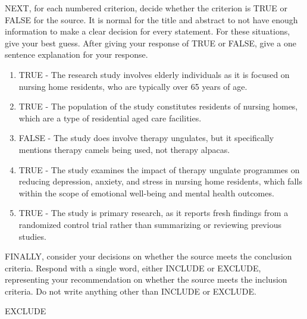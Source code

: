 \documentclass{article}
\begin{document}
\begin{description}
    \System NEXT, for each numbered criterion, decide whether the criterion is
    TRUE or FALSE for the source. It is normal for the title and abstract to
    not have enough information to make a clear decision for every statement.
    For these situations, give your best guess. After giving your response of
    TRUE or FALSE, give a one sentence explanation for your response.

    \GPT \begin{enumerate}
      \item{TRUE - The research study involves elderly individuals as it is
        focused on nursing home residents, who are typically over 65 years of
        age.}
      \item{TRUE - The population of the study constitutes residents of nursing
        homes, which are a type of residential aged care facilities.}
      \item{FALSE - The study does involve therapy ungulates, but it
        specifically mentions therapy camels being used, not therapy alpacas.}
      \item{TRUE - The study examines the impact of therapy ungulate programmes
        on reducing depression, anxiety, and stress in nursing home residents,
        which falls within the scope of emotional well-being and mental health
        outcomes.}
      \item{TRUE - The study is primary research, as it reports fresh findings
        from a randomized control trial rather than summarizing or reviewing
        previous studies.}
    \end{enumerate}

    \System FINALLY, consider your decisions on whether the source meets the
    conclusion criteria. Respond with a single word, either INCLUDE or EXCLUDE,
    representing your recommendation on whether the source meets the inclusion
    criteria. Do not write anything other than INCLUDE or EXCLUDE.

    \GPT EXCLUDE

\end{description}
\end{document}
